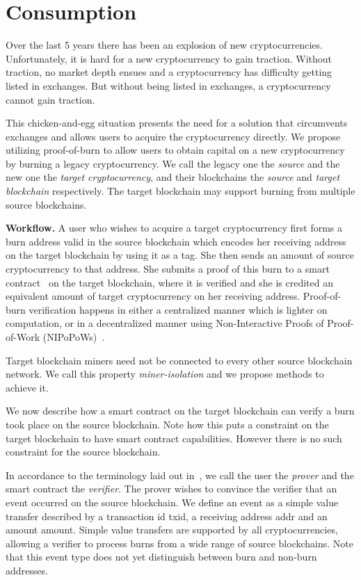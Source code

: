 \section{Consumption}

Over the last 5 years there has been an explosion of new cryptocurrencies. Unfortunately, it is hard for a new cryptocurrency to gain traction. Without traction, no market depth ensues and a cryptocurrency has difficulty getting listed in exchanges. But without being listed in exchanges, a cryptocurrency cannot gain traction.

This chicken-and-egg situation presents the need for a solution that circumvents exchanges and allows users to acquire the cryptocurrency directly. We propose utilizing proof-of-burn to allow users to obtain capital on a new cryptocurrency by burning a legacy cryptocurrency. We call the legacy one the \emph{source} and the new one the \emph{target cryptocurrency}, and their blockchains the \emph{source} and \emph{target blockchain} respectively. The target blockchain may support burning from multiple source blockchains.

\noindent
\textbf{Workflow.}
A user who wishes to acquire a target cryptocurrency first forms a burn address valid in the source blockchain which encodes her receiving address on the target blockchain by using it as a tag. She then sends an amount of source cryptocurrency to that address. She submits a proof of this burn to a smart contract~\cite{buterin} on the target blockchain, where it is verified and she is credited an equivalent amount of target cryptocurrency on her receiving address. Proof-of-burn verification happens in either a centralized manner which is lighter on computation, or in a decentralized manner using Non-Interactive Proofs of Proof-of-Work (NIPoPoWs)~\ifanonymous\cite{FCW:KiaLamSto16,nipopows}\else\cite{FCW:KiaLamSto16,nipopows,superblocks,gtklocker}\fi.

Target blockchain miners need not be connected to every other source blockchain network. We call this property \emph{miner-isolation} and we propose methods to achieve it.

We now describe how a smart contract on the target blockchain can verify a burn took place on the source blockchain. Note how this puts a constraint on the target blockchain to have smart contract capabilities. However there is no such constraint for the source blockchain.

In accordance to the terminology laid out in~\cite{pow-sidechains}, we call the user the \emph{prover} and the smart contract the \emph{verifier}. The prover wishes to convince the verifier that an event occurred on the source blockchain. We define an event as a simple value transfer described by a transaction id \textsf{txid}, a receiving address \textsf{addr} and an amount \textsf{amount}. Simple value transfers are supported by all cryptocurrencies, allowing a verifier to process burns from a wide range of source blockchains. Note that this event type does not yet distinguish between burn and non-burn addresses.

